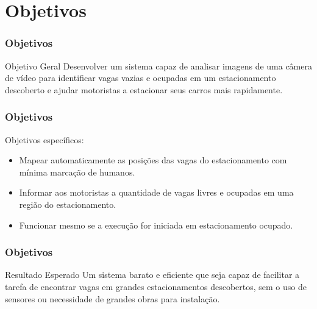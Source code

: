 \documentclass{beamer}
\begin{document}
\section{Objetivos}
\begin{frame}
\frametitle{Objetivos}
\begin{block}{Objetivo Geral}
Desenvolver um sistema capaz de analisar imagens de uma câmera de vídeo para identificar vagas vazias e ocupadas em um estacionamento descoberto e ajudar motoristas a estacionar seus carros mais rapidamente.
\end{block}

\end{frame}
\begin{frame}
\frametitle{Objetivos}
Objetivos específicos:
\begin{itemize}
  \item Mapear automaticamente as posições das vagas do estacionamento com mínima marcação de humanos.
  \item Informar aos motoristas a quantidade de vagas livres e ocupadas em uma região do estacionamento.
  \item Funcionar mesmo se a execução for iniciada em estacionamento ocupado.
\end{itemize}

\end{frame}
\begin{frame}
\frametitle{Objetivos}
\begin{block}{Resultado Esperado}
Um sistema barato e eficiente que seja capaz de facilitar a tarefa de encontrar vagas em grandes estacionamentos descobertos, sem o uso de sensores ou necessidade de grandes obras para instalação.
\end{block}
\end{frame}
\end{document}
